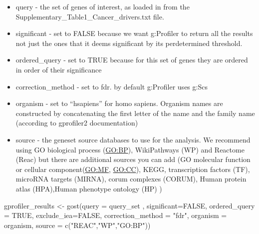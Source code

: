 \documentclass[
]{book}
\newenvironment{Shaded}{\begin{snugshade}}{\end{snugshade}}
\newcommand{\AttributeTok}[1]{\textcolor[rgb]{0.77,0.63,0.00}{#1}}
\newcommand{\CommentTok}[1]{\textcolor[rgb]{0.56,0.35,0.01}{\textit{#1}}}
\newcommand{\ConstantTok}[1]{\textcolor[rgb]{0.00,0.00,0.00}{#1}}
\newcommand{\DecValTok}[1]{\textcolor[rgb]{0.00,0.00,0.81}{#1}}
\newcommand{\FunctionTok}[1]{\textcolor[rgb]{0.00,0.00,0.00}{#1}}
\newcommand{\NormalTok}[1]{#1}
\newcommand{\OtherTok}[1]{\textcolor[rgb]{0.56,0.35,0.01}{#1}}
\newcommand{\SpecialCharTok}[1]{\textcolor[rgb]{0.00,0.00,0.00}{#1}}
\newcommand{\StringTok}[1]{\textcolor[rgb]{0.31,0.60,0.02}{#1}}
\providecommand{\tightlist}{%
  \setlength{\itemsep}{0pt}\setlength{\parskip}{0pt}}
\begin{document}
\begin{itemize}
\tightlist
\item
  query - the set of genes of interest, as loaded in from the Supplementary\_Table1\_Cancer\_drivers.txt file.
\item
  significant - set to FALSE because we want g:Profiler to return all the results not just the ones that it deems significant by its perdetermined threshold.
\item
  ordered\_query - set to TRUE because for this set of genes they are ordered in order of their significance
\item
  correction\_method - set to fdr. by default g:Profiler uses g:Scs
\item
  organism - set to ``hsapiens'' for homo sapiens. Organism names are constructed by concatenating the first letter of the name and the family name (according to gprofiler2 documentation)
\item
  source - the geneset source databases to use for the analysis. We recommend using GO biological process (\url{GO:BP}), WikiPathways (WP) and Reactome (Reac) but there are additional sources you can add (GO molecular function or cellular component(\url{GO:MF}, \url{GO:CC}), KEGG, transcription factors (TF), microRNA targets (MIRNA), corum complexes (CORUM), Human protein atlas (HPA),Human phenotype ontology (HP) )
\end{itemize}

\begin{Shaded}
\begin{Highlighting}[]
\NormalTok{gprofiler\_results }\OtherTok{\textless{}{-}} \FunctionTok{gost}\NormalTok{(}\AttributeTok{query =}\NormalTok{ query\_set ,}
                          \AttributeTok{significant=}\ConstantTok{FALSE}\NormalTok{,}
                          \AttributeTok{ordered\_query =} \ConstantTok{TRUE}\NormalTok{,}
                          \AttributeTok{exclude\_iea=}\ConstantTok{FALSE}\NormalTok{,}
                          \AttributeTok{correction\_method =} \StringTok{"fdr"}\NormalTok{,}
                          \AttributeTok{organism =}\NormalTok{ organism,}
                          \AttributeTok{source =} \FunctionTok{c}\NormalTok{(}\StringTok{"REAC"}\NormalTok{,}\StringTok{"WP"}\NormalTok{,}\StringTok{"GO:BP"}\NormalTok{))}
\end{Highlighting}
\end{Shaded}

\begin{Shaded}
\end{Shaded}
\end{document}
